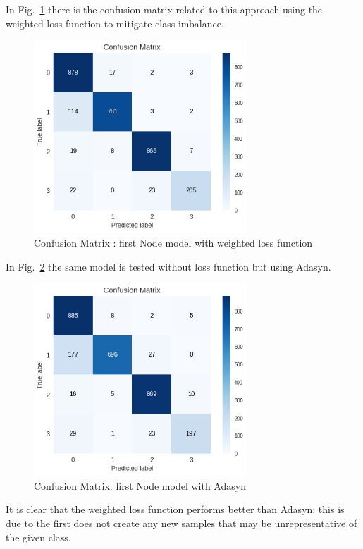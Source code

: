 \documentclass[LaM,binding=0.6cm]{sapthesis}
\begin{document}
In Fig.~\ref{fig:odetestwl} there is the confusion matrix related to this approach using the weighted loss function to mitigate class imbalance.
\begin{figure}[H]  \centering
    \includegraphics[width=80mm,scale=0.7]{odetestwl.png}
    \caption{Confusion Matrix : first Node model with weighted loss function}
    \label{fig:odetestwl}
\end{figure}
In Fig.~\ref{fig:odetestada} the same model is tested without loss function but using Adasyn.
\begin{figure}[H]  \centering
    \includegraphics[width=80mm,scale=0.7]{odetestada.png}
    \caption{Confusion Matrix: first Node model with Adasyn}
    \label{fig:odetestada}
\end{figure}
It is clear that the weighted loss function performs better than Adasyn: this is due to the first does not create any new samples that may be unrepresentative of the given class. 
\end{document}
